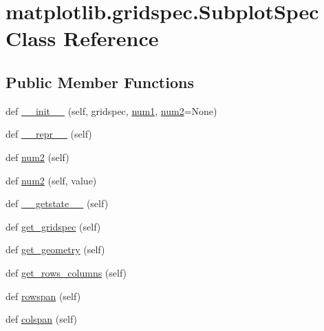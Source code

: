 \hypertarget{classmatplotlib_1_1gridspec_1_1SubplotSpec}{}\section{matplotlib.\+gridspec.\+Subplot\+Spec Class Reference}
\label{classmatplotlib_1_1gridspec_1_1SubplotSpec}
\subsection*{Public Member Functions}
\begin{DoxyCompactItemize}
\item 
def \hyperlink{classmatplotlib_1_1gridspec_1_1SubplotSpec_a9ab813f61256a11e4f13973be721d995}{\+\_\+\+\_\+init\+\_\+\+\_\+} (self, gridspec, \hyperlink{classmatplotlib_1_1gridspec_1_1SubplotSpec_ac04c4772b102d0b8634a5fa00d6acb56}{num1}, \hyperlink{classmatplotlib_1_1gridspec_1_1SubplotSpec_a903365a73f1070a8f41931d1fcd96e0f}{num2}=None)
\item 
def \hyperlink{classmatplotlib_1_1gridspec_1_1SubplotSpec_a5643936c9c55446f65e1fad56d36456f}{\+\_\+\+\_\+repr\+\_\+\+\_\+} (self)
\item 
def \hyperlink{classmatplotlib_1_1gridspec_1_1SubplotSpec_a49e95aa59788d14c8f6ce1cad1b94d5c}{num2} (self)
\item 
def \hyperlink{classmatplotlib_1_1gridspec_1_1SubplotSpec_a990d2d7b717fb360826e3a9c74aac5f1}{num2} (self, value)
\item 
def \hyperlink{classmatplotlib_1_1gridspec_1_1SubplotSpec_adc6c717a10bba91073a054f381682a1a}{\+\_\+\+\_\+getstate\+\_\+\+\_\+} (self)
\item 
def \hyperlink{classmatplotlib_1_1gridspec_1_1SubplotSpec_a7767bd58fb7f35a204113b41e7d60d5d}{get\+\_\+gridspec} (self)
\item 
def \hyperlink{classmatplotlib_1_1gridspec_1_1SubplotSpec_a78c47d1409407487c8f5191757e79a9a}{get\+\_\+geometry} (self)
\item 
def \hyperlink{classmatplotlib_1_1gridspec_1_1SubplotSpec_aa7829b8bc026e7b64c7e4dc9a15c8add}{get\+\_\+rows\+\_\+columns} (self)
\item 
def \hyperlink{classmatplotlib_1_1gridspec_1_1SubplotSpec_a6c1a7317d34c0bc30c3135bcd5e2ccaa}{rowspan} (self)
\item 
def \hyperlink{classmatplotlib_1_1gridspec_1_1SubplotSpec_a89bbd0f5fd46ec70ac8c36ea166a5e74}{colspan} (self)
\item 

\end{DoxyCompactItemize}
